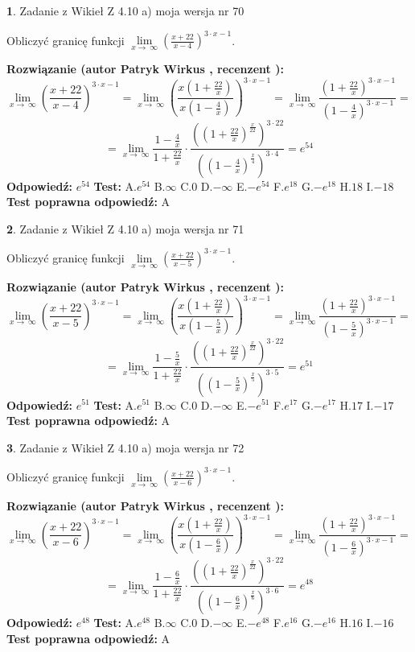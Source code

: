 \documentclass[12pt, a4paper]{article}
\theoremstyle{definition} %
\newtheorem{zad}{}
\newcommand{\zadStart}[1]{\begin{zad}#1\newline}
\newcommand{\zadStop}{\end{zad}}
\newcommand{\rozwStart}[2]{\noindent \textbf{Rozwiązanie (autor #1 , recenzent #2): }\newline}
\newcommand{\rozwStop}{\newline}
\newcommand{\odpStart}{\noindent \textbf{Odpowiedź:}\newline}
\newcommand{\odpStop}{\newline}
\newcommand{\testStart}{\noindent \textbf{Test:}\newline}
\newcommand{\testStop}{\newline}
\newcommand{\kluczStart}{\noindent \textbf{Test poprawna odpowiedź:}\newline}
\newcommand{\kluczStop}{\newline}
\begin{document}
\zadStart{Zadanie z Wikieł Z 4.10 a) moja wersja nr 70}

Obliczyć granicę funkcji  $\lim\limits_{x\to\ \infty}(\frac{x+22}{x-4})^{3\cdot x-1}$.
\zadStop
\rozwStart{Patryk Wirkus}{}
$$\lim\limits_{x\to\ \infty}(\frac{x+22}{x-4})^{3\cdot x-1} = \lim\limits_{x\to\ \infty}(\frac{x(1+\frac{22}{x})}{x(1-\frac{4}{x})})^{3\cdot x-1}=\lim\limits_{x\to\ \infty}\frac{(1+\frac{22}{x})^{3\cdot x-1}}{(1-\frac{4}{x})^{3\cdot x-1}}=$$
$$=\lim\limits_{x\to\ \infty}\frac{1-\frac{4}{x}}{1+\frac{22}{x}}\cdot\frac{((1+\frac{22}{x})^{\frac{x}{22}})^{3\cdot22}}{((1-\frac{4}{x})^{\frac{x}{4}})^{3\cdot4}}=e^{54}$$
\rozwStop
\odpStart
$e^{54}$
\odpStop
\testStart
A.$e^{54}$ B.$\infty$ C.$0$ D.$-\infty$ E.$-e^{54}$
F.$e^{18}$ G.$-e^{18}$
H.$18$
I.$-18$
\testStop
\kluczStart
A
\kluczStop



\zadStart{Zadanie z Wikieł Z 4.10 a) moja wersja nr 71}

Obliczyć granicę funkcji  $\lim\limits_{x\to\ \infty}(\frac{x+22}{x-5})^{3\cdot x-1}$.
\zadStop
\rozwStart{Patryk Wirkus}{}
$$\lim\limits_{x\to\ \infty}(\frac{x+22}{x-5})^{3\cdot x-1} = \lim\limits_{x\to\ \infty}(\frac{x(1+\frac{22}{x})}{x(1-\frac{5}{x})})^{3\cdot x-1}=\lim\limits_{x\to\ \infty}\frac{(1+\frac{22}{x})^{3\cdot x-1}}{(1-\frac{5}{x})^{3\cdot x-1}}=$$
$$=\lim\limits_{x\to\ \infty}\frac{1-\frac{5}{x}}{1+\frac{22}{x}}\cdot\frac{((1+\frac{22}{x})^{\frac{x}{22}})^{3\cdot22}}{((1-\frac{5}{x})^{\frac{x}{5}})^{3\cdot5}}=e^{51}$$
\rozwStop
\odpStart
$e^{51}$
\odpStop
\testStart
A.$e^{51}$ B.$\infty$ C.$0$ D.$-\infty$ E.$-e^{51}$
F.$e^{17}$ G.$-e^{17}$
H.$17$
I.$-17$
\testStop
\kluczStart
A
\kluczStop



\zadStart{Zadanie z Wikieł Z 4.10 a) moja wersja nr 72}

Obliczyć granicę funkcji  $\lim\limits_{x\to\ \infty}(\frac{x+22}{x-6})^{3\cdot x-1}$.
\zadStop
\rozwStart{Patryk Wirkus}{}
$$\lim\limits_{x\to\ \infty}(\frac{x+22}{x-6})^{3\cdot x-1} = \lim\limits_{x\to\ \infty}(\frac{x(1+\frac{22}{x})}{x(1-\frac{6}{x})})^{3\cdot x-1}=\lim\limits_{x\to\ \infty}\frac{(1+\frac{22}{x})^{3\cdot x-1}}{(1-\frac{6}{x})^{3\cdot x-1}}=$$
$$=\lim\limits_{x\to\ \infty}\frac{1-\frac{6}{x}}{1+\frac{22}{x}}\cdot\frac{((1+\frac{22}{x})^{\frac{x}{22}})^{3\cdot22}}{((1-\frac{6}{x})^{\frac{x}{6}})^{3\cdot6}}=e^{48}$$
\rozwStop
\odpStart
$e^{48}$
\odpStop
\testStart
A.$e^{48}$ B.$\infty$ C.$0$ D.$-\infty$ E.$-e^{48}$
F.$e^{16}$ G.$-e^{16}$
H.$16$
I.$-16$
\testStop
\kluczStart
A
\kluczStop
\end{document}
